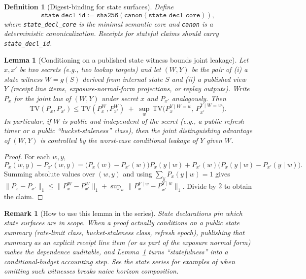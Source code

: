 \documentclass[11pt]{article}
\newtheorem{definition}{Definition}
\newtheorem{remark}{Remark}
\newtheorem{lemma}{Lemma}
\newcommand{\TV}{\mathrm{TV}}
\begin{document}
\begin{definition}[Digest-binding for state surfaces]
Define
\[\texttt{state\_decl\_id} := \texttt{sha256}(\texttt{canon}(\texttt{state\_decl\_core})),\]
where \texttt{state\_decl\_core} is the minimal semantic core and \texttt{canon} is a deterministic canonicalization.
Receipts for stateful claims should carry \texttt{state\_decl\_id}.\cite{series:receiptitems,series:workedexample}
\end{definition}

\begin{lemma}[Conditioning on a published state witness bounds joint leakage]\label{lem:tv_state_witness}
Let $x,x'$ be two secrets (e.g., two lookup targets) and let $(W,Y)$ be the pair of
(i) a \emph{state witness} $W=g(S)$ derived from internal state $S$ and
(ii) a published view $Y$ (receipt line items, exposure-normal-form projections, or replay outputs).
Write $P_x$ for the joint law of $(W,Y)$ under secret $x$ and $P_{x'}$ analogously.
Then
\[
\TV(P_x, P_{x'}) \le \TV(P_x^W, P_{x'}^W) \;+\; \sup_{w}\,\TV\!\big(P_x^{Y\mid W=w},\,P_{x'}^{Y\mid W=w}\big).
\]
In particular, if $W$ is public and independent of the secret (e.g., a public refresh timer or a public ``bucket-staleness'' class),
then the joint distinguishing advantage of $(W,Y)$ is controlled by the worst-case conditional leakage of $Y$ given $W$.
\end{lemma}

\begin{proof}
For each $w,y$,
\[
P_x(w,y)-P_{x'}(w,y)=\big(P_x(w)-P_{x'}(w)\big)P_x(y\mid w)+P_{x'}(w)\big(P_x(y\mid w)-P_{x'}(y\mid w)\big).
\]
Summing absolute values over $(w,y)$ and using $\sum_y P_x(y\mid w)=1$ gives
$\|P_x-P_{x'}\|_1 \le \|P_x^W-P_{x'}^W\|_1 + \sup_w \|P_x^{Y\mid w}-P_{x'}^{Y\mid w}\|_1$.
Divide by $2$ to obtain the claim.
\end{proof}

\begin{remark}[How to use this lemma in the series]
State \emph{declarations} pin which state surfaces are in scope.
When a proof actually conditions on a public state summary (rate-limit class, bucket-staleness class, refresh epoch),
publishing that summary as an explicit receipt line item (or as part of the exposure normal form) makes the dependence auditable,
and Lemma~\ref{lem:tv_state_witness} turns ``statefulness'' into a conditional-budget accounting step.
See the state series for examples of when omitting such witnesses breaks naive horizon composition.\cite{series:state1}
\end{remark}
\end{document}
